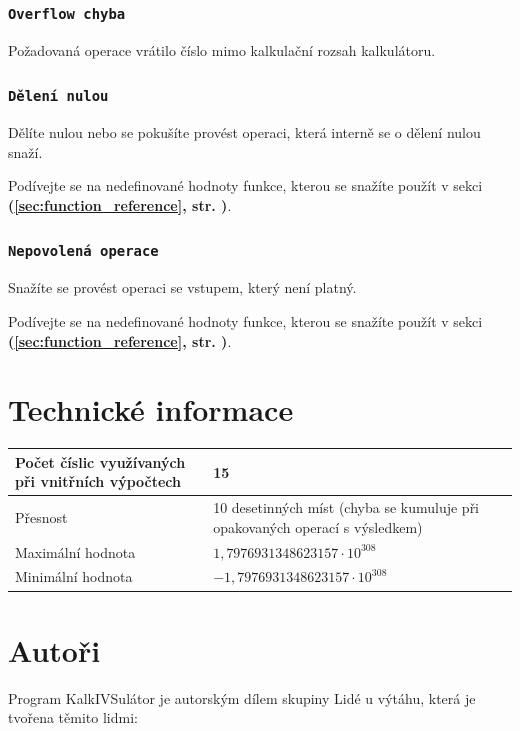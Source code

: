 \documentclass[a5paper,8pt,twoside]{extarticle}
\newcommand*\nref[1]{\textbf{(\ref{#1}, str. \pageref{#1})}}
\begin{document}
    \subsubsection{\texttt{Overflow chyba}}
    Požadovaná operace vrátilo číslo mimo kalkulační rozsah kalkulátoru.

    \subsubsection{\texttt{Dělení nulou}}
    Dělíte nulou nebo se pokušíte provést operaci, která interně se o dělení nulou snaží.

    Podívejte se na nedefinované hodnoty funkce, kterou se snažíte použít v sekci  \nref{sec:function_reference}.

    \subsubsection{\texttt{Nepovolená operace}}
    Snažíte se provést operaci se vstupem, který není platný.

    Podívejte se na nedefinované hodnoty funkce, kterou se snažíte použít v sekci  \nref{sec:function_reference}.    

    \section{Technické informace}

    \begin{table}[h]
    \begin{tabular}{|p{19em}|p{19em}|}
    \hline
    Počet číslic využívaných při vnitřních výpočtech & 15 \\ \hline
    Přesnost & 10 desetinných míst (chyba se kumuluje při opakovaných operací s výsledkem) \\ \hline
    Maximální hodnota & $1,7976931348623157 \cdot 10^{308}$ \\ \hline
    Minimální hodnota & $-1,7976931348623157 \cdot 10^{308}$ \\ \hline
    \end{tabular}
    \end{table}

    \section{Autoři}

    Program KalkIVSulátor je autorským dílem skupiny Lidé u výtáhu, která je tvořena těmito lidmi:
\end{document}
